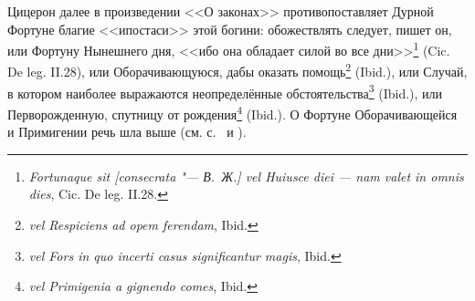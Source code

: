 Цицерон далее в произведении <<О законах>> противопоставляет Дурной Фортуне благие <<ипостаси>> этой богини: обожествлять следует, пишет он, или Фортуну Нынешнего дня, <<ибо она обладает силой во все дни>>\footnote{\textit{Fortunaque sit [consecrata "--- В.~Ж.] vel Huiusce diei — nam valet in omnis dies}, Cic. De leg. II.28.} (Cic. De leg. II.28), или Оборачивающуюся, дабы оказать помощь\footnote{\textit{vel Respiciens ad opem ferendam}, Ibid.} (Ibid.), или Случай, в котором наиболее выражаются неопределённые обстоятельства\footnote{\textit{vel Fors in quo incerti casus significantur magis}, Ibid.} (Ibid.), или  Перворожденную, спутницу от рождения\footnote{\textit{vel Primigenia a gignendo comes}, Ibid.} (Ibid.). О Фортуне Оборачивающейся и Примигении речь шла выше (см. с.~\pageref{FortunaRescipiens} и \pageref{FortunaPrimigenia}).





